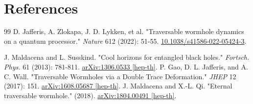 \documentclass[11pt,a4paper]{article}
\begin{document}
\section{References}
\begin{thebibliography}{99}
     D. Jafferis, A. Zlokapa, J. D. Lykken, et al. "Traversable wormhole dynamics on a quantum processor." \textit{Nature} 612 (2022): 51-55. \href{https://doi.org/10.1038/s41586-022-05424-3}{10.1038/s41586-022-05424-3}.

     J. Maldacena and L. Susskind. "Cool horizons for entangled black holes." \textit{Fortsch. Phys.} 61 (2013): 781-811. \href{https://arxiv.org/abs/1306.0533}{arXiv:1306.0533 [hep-th]}.
     P. Gao, D. L. Jafferis, and A. C. Wall. "Traversable Wormholes via a Double Trace Deformation." \textit{JHEP} 12 (2017): 151. \href{https://arxiv.org/abs/1608.05687}{arXiv:1608.05687 [hep-th]}.
     J. Maldacena and X.-L. Qi. "Eternal traversable wormhole." (2018). \href{https://arxiv.org/abs/1804.00491}{arXiv:1804.00491 [hep-th]}.
\end{thebibliography}
\end{document}
